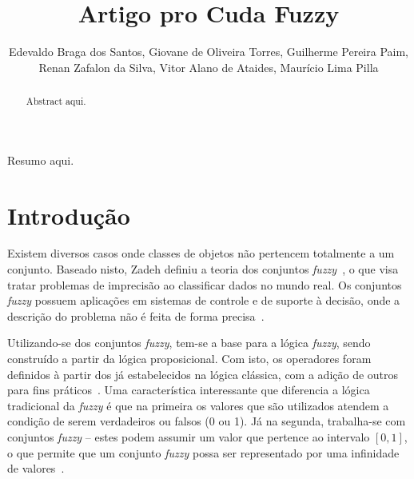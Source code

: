 \documentclass[12pt]{article}
\title{Artigo pro Cuda Fuzzy}
\author{Edevaldo Braga dos Santos\inst{1}, Giovane de Oliveira Torres\inst{1}, Guilherme Pereira Paim\inst{1},\\ Renan Zafalon da Silva\inst{1}, Vitor Alano de Ataides\inst{1}, Maurício Lima Pilla\inst{1}}
\begin{document}
\newcommand{\libname}{CudaFuzzy}

\maketitle

\begin{abstract}

Abstract aqui.

\end{abstract}

\begin{resumo}

Resumo aqui.

\end{resumo}

\section{Introdução}
\label{sec:introducao}


	Existem diversos casos onde classes de objetos não pertencem totalmente a um conjunto. Baseado nisto, Zadeh definiu a teoria dos conjuntos \textit{fuzzy}~\cite{zadeh:65}, o que visa tratar problemas de imprecisão ao classificar dados no mundo real. Os conjuntos \textit{fuzzy} possuem aplicações em sistemas de controle e de suporte à decisão, onde a descrição do problema não é feita de forma precisa~\cite{weber:03}.
	
	Utilizando-se dos conjuntos \textit{fuzzy}, tem-se a base para a lógica \textit{fuzzy}, sendo construído a partir da lógica proposicional. Com isto, os operadores foram definidos à partir dos já estabelecidos na lógica clássica, com a adição de outros para fins práticos~\cite{tanscheit:04}. Uma característica interessante que diferencia a lógica tradicional da \textit{fuzzy} é que na primeira os valores que são utilizados atendem a condição de serem verdadeiros ou falsos (0 ou 1). Já na segunda, trabalha-se com conjuntos \textit{fuzzy} -- estes podem assumir um valor que pertence ao intervalo $[0, 1]$, o que permite que um conjunto \textit{fuzzy} possa ser representado por uma infinidade de valores~\cite{klir:95}.	
	
\end{document}
